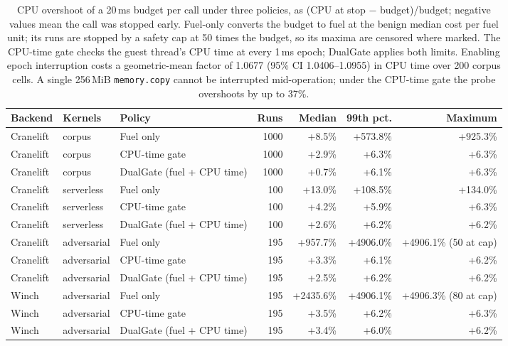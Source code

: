 \begin{table}[t]
\caption{CPU overshoot of a 20\,ms budget per call under three policies, as (CPU at stop $-$ budget)/budget; negative values mean the call was stopped early. Fuel-only converts the budget to fuel at the benign median cost per fuel unit; its runs are stopped by a safety cap at 50 times the budget, so its maxima are censored where marked. The CPU-time gate checks the guest thread's CPU time at every 1\,ms epoch; DualGate applies both limits. Enabling epoch interruption costs a geometric-mean factor of 1.0677 (95\% CI 1.0406--1.0955) in CPU time over 200 corpus cells. A single 256\,MiB \texttt{memory.copy} cannot be interrupted mid-operation; under the CPU-time gate the probe overshoots by up to 37\%.}\label{tab:quota}
\footnotesize
\setlength{\tabcolsep}{4pt}%
\begin{adjustbox}{max width=\textwidth}%
\begin{tabular}{lllrrrr}
\toprule
Backend & Kernels & Policy & Runs & Median & 99th pct. & Maximum \\
\midrule
Cranelift & corpus & Fuel only & 1000 & +8.5\% & +573.8\% & +925.3\% \\
Cranelift & corpus & CPU-time gate & 1000 & +2.9\% & +6.3\% & +6.3\% \\
Cranelift & corpus & DualGate (fuel + CPU time) & 1000 & +0.7\% & +6.1\% & +6.3\% \\
Cranelift & serverless & Fuel only & 100 & +13.0\% & +108.5\% & +134.0\% \\
Cranelift & serverless & CPU-time gate & 100 & +4.2\% & +5.9\% & +6.3\% \\
Cranelift & serverless & DualGate (fuel + CPU time) & 100 & +2.6\% & +6.2\% & +6.2\% \\
Cranelift & adversarial & Fuel only & 195 & +957.7\% & +4906.0\% & +4906.1\% (50 at cap) \\
Cranelift & adversarial & CPU-time gate & 195 & +3.3\% & +6.1\% & +6.2\% \\
Cranelift & adversarial & DualGate (fuel + CPU time) & 195 & +2.5\% & +6.2\% & +6.2\% \\
Winch & adversarial & Fuel only & 195 & +2435.6\% & +4906.1\% & +4906.3\% (80 at cap) \\
Winch & adversarial & CPU-time gate & 195 & +3.5\% & +6.2\% & +6.3\% \\
Winch & adversarial & DualGate (fuel + CPU time) & 195 & +3.4\% & +6.0\% & +6.2\% \\
\bottomrule
\end{tabular}%
\end{adjustbox}
\end{table}
